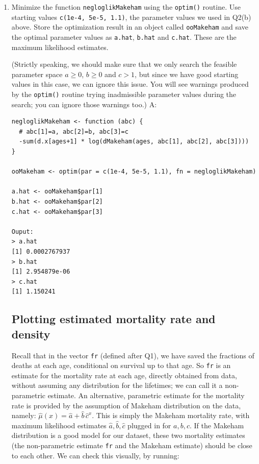 \documentclass{article}
\begin{document}
\begin{enumerate}
In this function, \texttt{abc} is a vector of length 3 with values for $a, b, c$. Using \texttt{ages} rather than \texttt{allages}, we disregard sample elements with $k_i < 3$, which are dominated by infant mortality rather than influenced by the Makeham parameters.

\item[$\boldsymbol{Q_3}$] Minimize the function \texttt{negloglikMakeham} using the \texttt{optim()} routine. Use starting values \texttt{c(1e-4, 5e-5, 1.1)}, the parameter values we used in Q2(b) above. Store the optimization result in an object called \texttt{ooMakeham} and save the optimal parameter values as \texttt{a.hat}, \texttt{b.hat} and \texttt{c.hat}. These are the maximum likelihood estimates.

(Strictly speaking, we should make sure that we only search the feasible parameter space $a \geq 0$, $b \geq 0$ and $c > 1$, but since we have good starting values in this case, we can ignore this issue. You will see warnings produced by the \texttt{optim()} routine trying inadmissible parameter values during the search; you can ignore those warnings too.)
\newline \newline A:
\begin{verbatim}
negloglikMakeham <- function (abc) {
  # abc[1]=a, abc[2]=b, abc[3]=c
  -sum(d.x[ages+1] * log(dMakeham(ages, abc[1], abc[2], abc[3])))
}

ooMakeham <- optim(par = c(1e-4, 5e-5, 1.1), fn = negloglikMakeham)

a.hat <- ooMakeham$par[1]
b.hat <- ooMakeham$par[2]
c.hat <- ooMakeham$par[3]

Ouput:
> a.hat
[1] 0.0002767937
> b.hat
[1] 2.954879e-06
> c.hat
[1] 1.150241
\end{verbatim}
\newpage
\subsection*{Plotting estimated mortality rate and density}

Recall that in the vector \texttt{fr} (defined after Q1), we have saved the fractions of deaths at each age, conditional on survival up to that age. So \texttt{fr} is an estimate for the mortality rate at each age, directly obtained from data, without assuming any distribution for the lifetimes; we can call it a non-parametric estimate. An alternative, parametric estimate for the mortality rate is provided by the assumption of Makeham distribution on the data, namely: $\hat{\mu}(x) = \hat{a} + \hat{b}\, \hat{c}^x$. This is simply the Makeham mortality rate, with maximum likelihood estimates $\hat{a}, \hat{b}, \hat{c}$ plugged in for $a, b, c$. If the Makeham distribution is a good model for our dataset, these two mortality estimates (the non-parametric estimate \texttt{fr} and the Makeham estimate) should be close to each other. We can check this visually, by running:


\end{enumerate}
\end{document}
